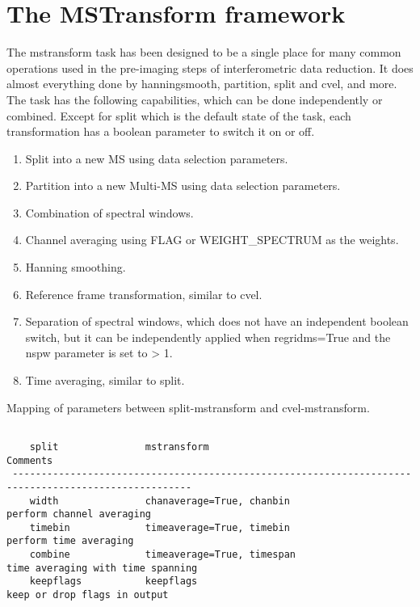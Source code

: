 

\section{The MSTransform framework}\label{Sec:Running}
The mstransform task has been designed to be a single place for many
common operations used in the pre-imaging steps of interferometric
data reduction. It does almost everything done by hanningsmooth,
partition, split and cvel, and more. The task has the following capabilities,
which can be done independently or combined. Except for split which is the default 
state of the task, each transformation has a boolean parameter to switch it on
or off.

\begin{enumerate}
\item Split into a new MS using data selection parameters.
\item Partition into a new Multi-MS using data selection parameters.
\item Combination of spectral windows.
\item Channel averaging using FLAG or WEIGHT_SPECTRUM as the weights.
\item Hanning smoothing.
\item Reference frame transformation, similar to cvel.
\item Separation of spectral windows, which does not have an independent
boolean switch, but it can be independently applied when regridms=True and
the nspw parameter is set to > 1.
\item Time averaging, similar to split.

\end{enumerate}

Mapping of parameters between split-mstransform and cvel-mstransform.

\begin{verbatim}

    split               mstransform                                      Comments
 -----------------------------------------------------------------------------------------------------
    width               chanaverage=True, chanbin                        perform channel averaging
    timebin             timeaverage=True, timebin                        perform time averaging
    combine             timeaverage=True, timespan                       time averaging with time spanning
    keepflags           keepflags                                        keep or drop flags in output

\end{verbatim}



